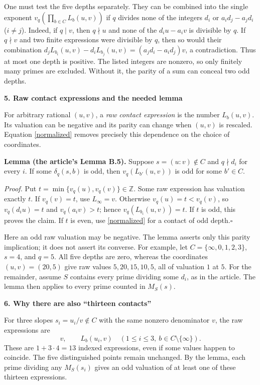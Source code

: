 \documentclass[11pt]{article}
\newcommand{\Z}{\mathbb Z}
\newcommand{\heading}[1]{\vspace{4pt}\textbf{#1}\par\vspace{-3pt}}
\begin{document}
One must test the five depths separately. They can be combined into the single exponent $v_q(\prod_{b\in C}L_b(u,v))$ if $q$ divides none of the integers $d_i$ or $a_i d_j-a_j d_i$ ($i\ne j$). Indeed, if $q\mid v$, then $q\nmid u$ and none of the $d_i u-a_i v$ is divisible by $q$. If $q\nmid v$ and two finite expressions were divisible by $q$, then so would their combination $d_jL_{b_i}(u,v)-d_iL_{b_j}(u,v)=(a_jd_i-a_id_j)v$, a contradiction. Thus at most one depth is positive. The listed integers are nonzero, so only finitely many primes are excluded. Without it, the parity of a sum can conceal two odd depths.

\heading{5. Raw contact expressions and the needed lemma}
For arbitrary rational $(u,v)$, a \emph{raw contact expression} is the number $L_b(u,v)$. Its valuation can be negative and its parity can change when $(u,v)$ is rescaled. Equation \eqref{normalized} removes precisely this dependence on the choice of coordinates.

\textbf{Lemma (the article's Lemma B.5).} Suppose $s=(u:v)\notin C$ and $q\nmid d_i$ for every $i$. If some $\delta_q(s,b)$ is odd, then $v_q(L_{b'}(u,v))$ is odd for some $b'\in C$.

\emph{Proof.} Put $t=\min\{v_q(u),v_q(v)\}\in\Z$. Some raw expression has valuation exactly $t$. If $v_q(v)=t$, use $L_\infty=v$. Otherwise $v_q(u)=t<v_q(v)$, so $v_q(d_i u)=t$ and $v_q(a_i v)>t$; hence $v_q(L_{b_i}(u,v))=t$. If $t$ is odd, this proves the claim. If $t$ is even, use \eqref{normalized} for a contact of odd depth.\hfill$\square$

Here an odd raw valuation may be negative. The lemma asserts only this parity implication; it does not assert its converse. For example, let $C=\{\infty,0,1,2,3\}$, $s=4$, and $q=5$. All five depths are zero, whereas the coordinates $(u,v)=(20,5)$ give raw values $5,20,15,10,5$, all of valuation $1$ at $5$. For the remainder, assume $S$ contains every prime dividing some $d_i$, as in the article. The lemma then applies to every prime counted in $M_S(s)$.

\heading{6. Why there are also ``thirteen contacts''}
For three slopes $s_i=u_i/v\notin C$ with the same nonzero denominator $v$, the raw expressions are
\[
v,\qquad L_b(u_i,v)\quad(1\le i\le3,\ b\in C\setminus\{\infty\}).
\]
These are $1+3\cdot4=13$ indexed expressions, even if some values happen to coincide. The five distinguished points remain unchanged. By the lemma, each prime dividing any $M_S(s_i)$ gives an odd valuation of at least one of these thirteen expressions.
\end{document}

